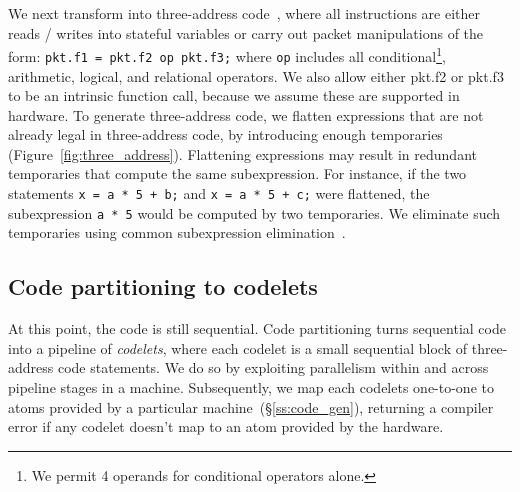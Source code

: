 We next transform into three-address code~\cite{tac}, where all instructions
are either reads / writes into stateful variables or carry out packet
manipulations of the form: \texttt{pkt.f1 = pkt.f2 op pkt.f3;} where
\texttt{op} includes all conditional\footnote{We permit 4 operands for
conditional operators alone.}, arithmetic, logical, and relational operators.
We also allow either pkt.f2 or pkt.f3 to be an intrinsic function call, because
we assume these are supported in hardware. To generate three-address code, we
flatten expressions that are not already legal in three-address code, by
introducing enough temporaries (Figure~\ref{fig:three_address}).  Flattening
expressions may result in redundant temporaries that compute the same
subexpression. For instance, if the two statements \texttt{x = a * 5 + b;} and
\texttt{x = a * 5 + c;} were flattened, the subexpression \texttt{a * 5} would
be computed by two temporaries. We eliminate such temporaries using common
subexpression elimination~\cite{cse}.

\subsection{Code partitioning to codelets}
\label{ss:partitioning}
At this point, the code is still sequential. Code partitioning turns sequential
code into a pipeline of \textit{codelets}, where each codelet is a small
sequential block of three-address code statements. We do so by exploiting
parallelism within and across pipeline stages in a \absmachine machine.
Subsequently, we map each codelets one-to-one to atoms provided by a particular
\absmachine machine~(\S\ref{ss:code_gen}), returning a compiler error if any
codelet doesn't map to an atom provided by the hardware.

